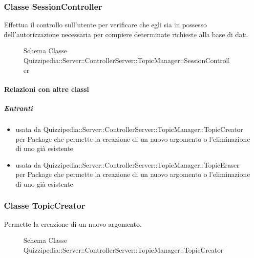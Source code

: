 \subsubsection{Classe SessionController}
Effettua il controllo sull'utente per verificare che egli sia in possesso dell'autorizzazione necessaria per compiere determinate richieste alla base di dati.
\begin{figure}[H]
\centering
\noindent{}
\caption[Schema Classe SessionController]{Schema Classe Quizzipedia::Server::ControllerServer::TopicManager::SessionController}
\end{figure}
\paragraph{Relazioni con altre classi}
\subparagraph{Entranti}
\begin{itemize}
\item usata da Quizzipedia::Server::ControllerServer::TopicManager::TopicCreator per Package che permette la creazione di un nuovo argomento o l'eliminazione di uno già esistente
\item usata da Quizzipedia::Server::ControllerServer::TopicManager::TopicEraser per Package che permette la creazione di un nuovo argomento o l'eliminazione di uno già esistente
\end{itemize}
\subsubsection{Classe TopicCreator}
Permette la creazione di un nuovo argomento.
\begin{figure}[H]
\centering
\noindent{}
\caption[Schema Classe TopicCreator]{Schema Classe Quizzipedia::Server::ControllerServer::TopicManager::TopicCreator}
\end{figure}
